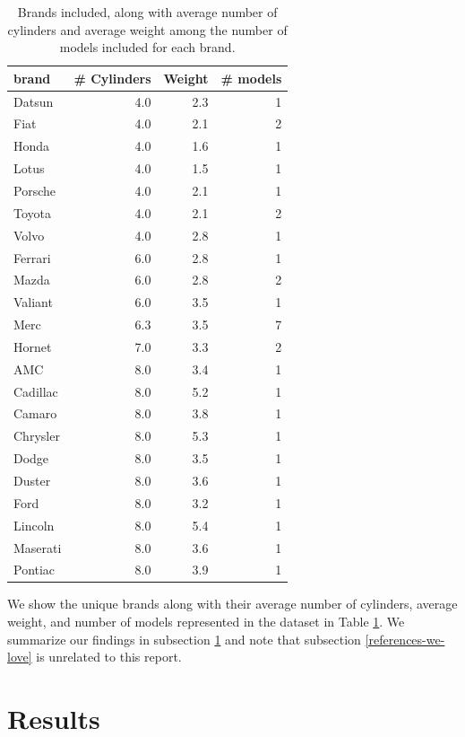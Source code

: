 \documentclass[
]{article}
\begin{document}
\begin{table}

\caption{\label{tab:summary-tbl}Brands included, along with average number of cylinders and average weight among the number of models included for each brand.}
\centering
\begin{tabular}[t]{l|r|r|r}
\hline
brand & \# Cylinders & Weight & \# models\\
\hline
Datsun & 4.0 & 2.3 & 1\\
\hline
Fiat & 4.0 & 2.1 & 2\\
\hline
Honda & 4.0 & 1.6 & 1\\
\hline
Lotus & 4.0 & 1.5 & 1\\
\hline
Porsche & 4.0 & 2.1 & 1\\
\hline
Toyota & 4.0 & 2.1 & 2\\
\hline
Volvo & 4.0 & 2.8 & 1\\
\hline
Ferrari & 6.0 & 2.8 & 1\\
\hline
Mazda & 6.0 & 2.8 & 2\\
\hline
Valiant & 6.0 & 3.5 & 1\\
\hline
Merc & 6.3 & 3.5 & 7\\
\hline
Hornet & 7.0 & 3.3 & 2\\
\hline
AMC & 8.0 & 3.4 & 1\\
\hline
Cadillac & 8.0 & 5.2 & 1\\
\hline
Camaro & 8.0 & 3.8 & 1\\
\hline
Chrysler & 8.0 & 5.3 & 1\\
\hline
Dodge & 8.0 & 3.5 & 1\\
\hline
Duster & 8.0 & 3.6 & 1\\
\hline
Ford & 8.0 & 3.2 & 1\\
\hline
Lincoln & 8.0 & 5.4 & 1\\
\hline
Maserati & 8.0 & 3.6 & 1\\
\hline
Pontiac & 8.0 & 3.9 & 1\\
\hline
\end{tabular}
\end{table}

We show the unique brands along with their average number of cylinders, average weight, and number of models represented in the dataset in Table \ref{tab:summary-tbl}. We summarize our findings in subsection \ref{results} and note that subsection \ref{references-we-love} is unrelated to this report.

\hypertarget{results}{%
\section{Results}\label{results}}
\end{document}
